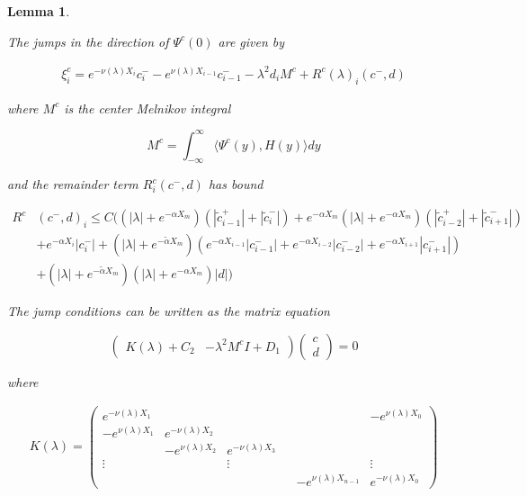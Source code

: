 \documentclass[12pt]{article}
\newtheorem{lemma}{Lemma}
\begin{document}
\begin{lemma}\label{jumpcenteradj}

The jumps in the direction of $\Psi^c(0)$ are given by

\begin{align}\label{xic}
\xi^c_i = e^{-\nu(\lambda) X_i} c_i^- - e^{\nu(\lambda) X_{i-1}} c_{i-1}^- - \lambda^2 d_i M^c + R^c(\lambda)_i(c^-, d)
\end{align}

where $M^c$ is the center Melnikov integral

\begin{equation}\label{Mc}
M^c =  \int_{-\infty}^\infty \langle \Psi^c(y), H(y) \rangle dy 
\end{equation}

and the remainder term $R^c_i(c^-, d)$ has bound

\begin{align}\label{Rc}
R^c&(c^-, d)_i \leq C \Big(
(|\lambda| + e^{-\alpha X_m})(|\tilde{c}_{i-1}^+| + |\tilde{c}_{i}^-|) + e^{-\alpha X_m}(|\lambda| + e^{-\alpha X_m})( |\tilde{c}_{i-2}^+| + |\tilde{c}_{i+1}^-|)  \nonumber \\
&+ e^{-\alpha X_i} |c_i^-| + (|\lambda| + e^{-\tilde{\alpha} X_m})( e^{-\alpha X_{i-1}} |c_{i-1}^-| + e^{-\alpha X_{i-2}} |c_{i-2}^-| + e^{-\alpha X_{i+1}} |c_{i+1}^-|) \\
&+ (|\lambda| + e^{-\tilde{\alpha} X_m})(|\lambda| + e^{-\alpha X_m})|d|
\Big) \nonumber
\end{align}

The jump conditions can be written as the matrix equation

\begin{equation}\label{matrixjumpc}
\begin{pmatrix}
K(\lambda) + C_2  & -\lambda^2 M^c I + D_1
\end{pmatrix}
\begin{pmatrix}
c \\ d
\end{pmatrix} = 0
\end{equation}

where

\begin{align*}
K(\lambda) =  
\begin{pmatrix}
e^{-\nu(\lambda)X_1} & & & & & -e^{\nu(\lambda)X_0} \\
-e^{\nu(\lambda)X_1} & e^{-\nu(\lambda)X_2} \\
& -e^{\nu(\lambda)X_2} & e^{-\nu(\lambda)X_3} \\
\vdots & & \vdots & &&  \vdots \\
& & & & -e^{\nu(\lambda)X_{n-1}} & e^{-\nu(\lambda)X_0} 
\end{pmatrix}
\end{align*}


\end{lemma}
\end{document}
